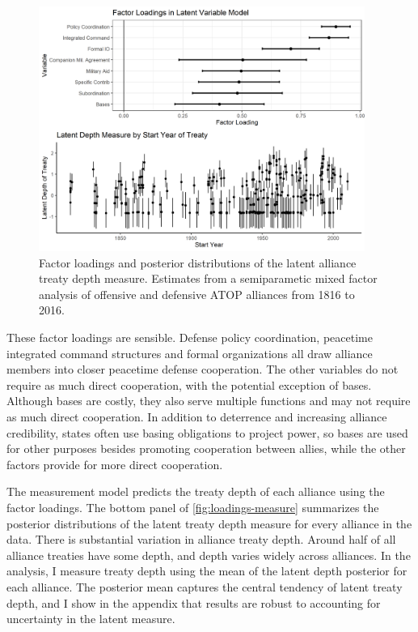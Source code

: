 \documentclass[12pt]{article}
\begin{document}
\begin{figure}[hbtp]
\centering
\includegraphics[width=0.95\textwidth]{../figures/loadings-measure.png}
\caption{Factor loadings and posterior distributions of the latent alliance treaty depth measure. Estimates from a semiparametic mixed factor analysis of offensive and defensive ATOP alliances from 1816 to 2016.}
\label{fig:loadings-measure}
\end{figure}


These factor loadings are sensible. 
Defense policy coordination, peacetime integrated command structures and formal organizations all draw alliance members into closer peacetime defense cooperation. 
The other variables do not require as much direct cooperation, with the potential exception of bases.
Although bases are costly, they also serve multiple functions and may not require as much direct cooperation. 
In addition to deterrence and increasing alliance credibility, states often use basing obligations to project power, so bases are used for other purposes besides promoting cooperation between allies, while the other factors provide for more direct cooperation.  


The measurement model predicts the treaty depth of each alliance using the factor loadings. 
The bottom panel of \autoref{fig:loadings-measure} summarizes the posterior distributions of the latent treaty depth measure for every alliance in the data. 
There is substantial variation in alliance treaty depth. 
Around half of all alliance treaties have some depth, and depth varies widely across alliances.
In the analysis, I measure treaty depth using the mean of the latent depth posterior for each alliance. 
The posterior mean captures the central tendency of latent treaty depth, and I show in the appendix that results are robust to accounting for uncertainty in the latent measure. 
\end{document}
